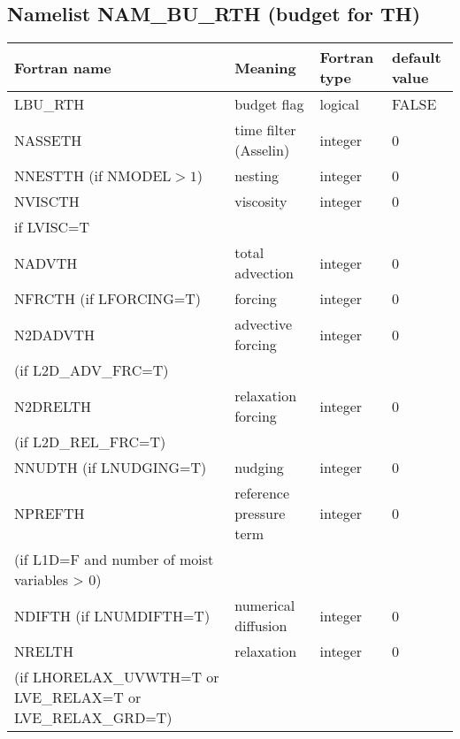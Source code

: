 \subsection{Namelist NAM\_BU\_RTH (budget for TH)}
\begin{longtable} {|p{}|p{}|>{\centering}p{}|p{}<{\centering}|}
\hline
Fortran name & Meaning & Fortran type & default value \\
\hline \hline
\endhead
LBU\_RTH & budget flag & logical & FALSE\index{LBU\_RTH!\innam{NAM\_BU\_RTH}} \\\hline
NASSETH  & time filter (Asselin)   & integer  &  0 \index{NASSETH!\innam{NAM\_BU\_RTH}} \\\hline
NNESTTH (if NMODEL$>1$) & nesting           & integer  &  0 \index{NNESTTH!\innam{NAM\_BU\_RTH}} \\\hline
NVISCTH  & viscosity         & integer  &  0 \index{NVISCTH!\innam{NAM\_BU\_RTH}}\\
if LVISC=T &  &   &   \\\hline
NADVTH   & total advection   & integer  &  0 \index{NADVTH!\innam{NAM\_BU\_RTH}}\\\hline
NFRCTH (if LFORCING=T)   & forcing           & integer  &  0 \index{NFRCTH!\innam{NAM\_BU\_RTH}} \\\hline
N2DADVTH   &advective forcing           & integer  &  0 \index{N2DADVTH!\innam{NAM\_BU\_RTH}} \\ \nopagebreak
(if L2D\_ADV\_FRC=T) &  &   &   \\\hline
N2DRELTH   & relaxation forcing           & integer  &  0 \index{N2DRLETH!\innam{NAM\_BU\_RTH}} \\ \nopagebreak
(if L2D\_REL\_FRC=T) &  &   &   \\\hline
NNUDTH (if LNUDGING=T)  & nudging           & integer  &  0 \index{NNUDTH!\innam{NAM\_BU\_RTH}} \\\hline
NPREFTH  & reference pressure term  & integer  &  0 \index{NPREFTH!\innam{NAM\_BU\_RTH}} \\ 
(if L1D=F and number of moist variables > 0) &  &   &   \\\hline
NDIFTH (if LNUMDIFTH=T)   & numerical diffusion & integer  &  0 \index{NDIFTH!\innam{NAM\_BU\_RTH}}\\\hline
NRELTH   & relaxation        & integer  &  0 \index{NRELTH!\innam{NAM\_BU\_RTH}}\\ \nopagebreak
(if LHORELAX\_UVWTH=T or LVE\_RELAX=T or LVE\_RELAX\_GRD=T) &  &   &   \\\hline

\end{longtable}

